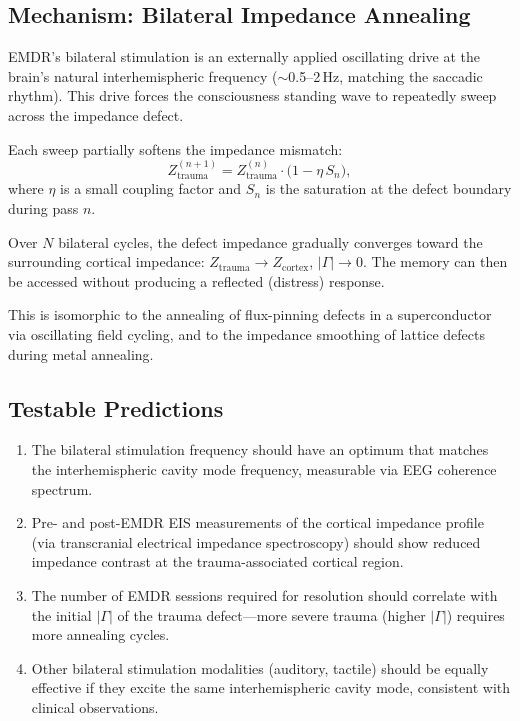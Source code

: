 \subsection{Mechanism: Bilateral Impedance Annealing}

EMDR's bilateral stimulation is an externally applied oscillating
drive at the brain's natural interhemispheric frequency
($\sim$0.5--2\,Hz, matching the saccadic rhythm).  This drive
forces the consciousness standing wave to repeatedly sweep across
the impedance defect.

Each sweep partially softens the impedance mismatch:
\begin{equation}
  Z_{\mathrm{trauma}}^{(n+1)}
  = Z_{\mathrm{trauma}}^{(n)} \cdot
    \bigl(1 - \eta\,S_n\bigr),
\end{equation}
where $\eta$ is a small coupling factor and $S_n$ is the
saturation at the defect boundary during pass $n$.

Over $N$ bilateral cycles, the defect impedance gradually
converges toward the surrounding cortical impedance:
$Z_{\mathrm{trauma}} \to Z_{\mathrm{cortex}}$,
$|\Gamma| \to 0$.  The memory can then be accessed without
producing a reflected (distress) response.

This is isomorphic to the annealing of flux-pinning defects in
a superconductor via oscillating field cycling, and to the
impedance smoothing of lattice defects during metal annealing.

\subsection{Testable Predictions}

\begin{enumerate}
  \item The bilateral stimulation frequency should have an optimum
        that matches the interhemispheric cavity mode frequency,
        measurable via EEG coherence spectrum.
  \item Pre- and post-EMDR EIS measurements of the cortical
        impedance profile (via transcranial electrical impedance
        spectroscopy) should show reduced impedance contrast at
        the trauma-associated cortical region.
  \item The number of EMDR sessions required for resolution should
        correlate with the initial $|\Gamma|$ of the trauma
        defect---more severe trauma (higher $|\Gamma|$) requires
        more annealing cycles.
  \item Other bilateral stimulation modalities (auditory, tactile)
        should be equally effective if they excite the same
        interhemispheric cavity mode, consistent with clinical
        observations.
\end{enumerate}


